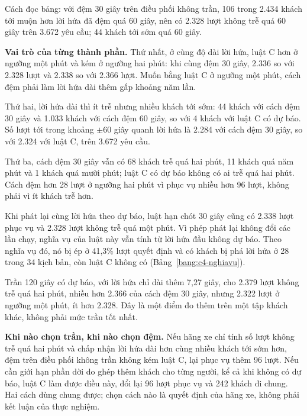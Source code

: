 Cách đọc bảng: với đệm 30 giây trên điều phối không trần, 106 trong 2.434 khách tới muộn hơn lời hứa đã đệm quá 60
giây, nên có 2.328 lượt không trễ quá 60 giây trên 3.672 yêu cầu; 44 khách tới sớm quá 60 giây.

\textbf{Vai trò của từng thành phần.} Thứ nhất, ở cùng độ dài lời hứa, luật C hơn ở ngưỡng một phút và kém ở ngưỡng hai
phút: khi cùng đệm 30 giây, 2.336 so với 2.328 lượt và 2.338 so với 2.366 lượt. Muốn bằng luật C ở ngưỡng một phút,
cách đệm phải làm lời hứa dài thêm gấp khoảng năm lần.

Thứ hai, lời hứa dài thì ít trễ nhưng nhiều khách tới sớm: 44 khách với cách đệm 30 giây và 1.033 khách với cách đệm 60
giây, so với 4 khách với luật C có dự báo. Số lượt tới trong khoảng $\pm$60 giây quanh lời hứa là 2.284 với cách đệm 30
giây, so với 2.324 với luật C, trên 3.672 yêu cầu.

Thứ ba, cách đệm 30 giây vẫn có 68 khách trễ quá hai phút, 11 khách quá năm phút và 1 khách quá mười phút; luật C có
dự báo không có ai trễ quá hai phút. Cách đệm hơn 28 lượt ở ngưỡng hai phút vì phục vụ nhiều hơn 96 lượt, không phải vì
ít khách trễ hơn.

Khi phát lại cùng lời hứa theo dự báo, luật hạn chót 30 giây cũng có 2.338 lượt phục vụ và 2.328 lượt không trễ quá
một phút. Vì phép phát lại không đổi các lần chạy, nghĩa vụ của luật này vẫn tính từ lời hứa đầu không dự báo. Theo
nghĩa vụ đó, nó bị ép ở 41,3\% lượt quyết định và có khách bị phá lời hứa ở 28 trong 34 kịch bản, còn luật C không có
(Bảng~\ref{bang:c4-nghiavu}).

Trần 120 giây có dự báo, với lời hứa chỉ dài thêm 7,27 giây, cho 2.379 lượt không trễ quá hai phút, nhiều hơn 2.366
của cách đệm 30 giây, nhưng 2.322 lượt ở ngưỡng một phút, ít hơn 2.328. Đây là một điểm đo thêm trên một tập khách khác,
không phải mức trần tốt nhất.

\textbf{Khi nào chọn trần, khi nào chọn đệm.} Nếu hãng xe chỉ tính số lượt không trễ quá hai phút và chấp nhận lời hứa
dài hơn cùng nhiều khách tới sớm hơn, đệm trên điều phối không trần không kém luật C, lại phục vụ thêm 96 lượt. Nếu cần
giới hạn phần dời do ghép thêm khách cho từng người, kể cả khi không có dự báo, luật C làm được điều này, đổi lại 96
lượt phục vụ và 242 khách đi chung. Hai cách dùng chung được; chọn cách nào là quyết định của hãng xe, không phải kết
luận của thực nghiệm.


